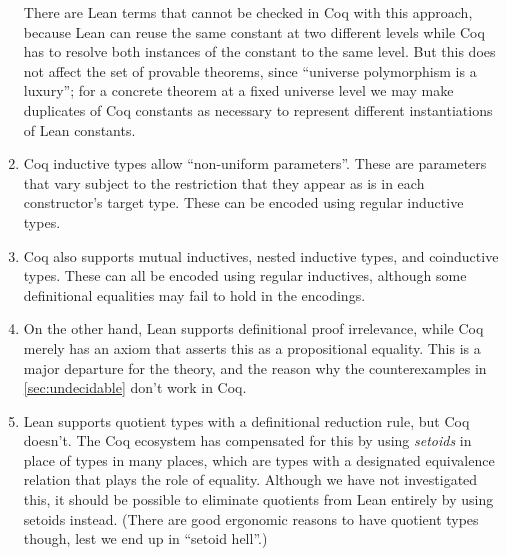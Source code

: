 \begin{enumerate}
There are Lean terms that cannot be checked in Coq with this approach, because Lean can reuse the same constant at two different levels while Coq has to resolve both instances of the constant to the same level. But this does not affect the set of provable theorems, since ``universe polymorphism is a luxury''; for a concrete theorem at a fixed universe level we may make duplicates of Coq constants as necessary to represent different instantiations of Lean constants.

\item Coq inductive types allow ``non-uniform parameters''. These are parameters that vary subject to the restriction that they appear as is in each constructor's target type. These can be encoded using regular inductive types.

\item Coq also supports mutual inductives, nested inductive types, and coinductive types. These can all be encoded using regular inductives, although some definitional equalities may fail to hold in the encodings.

\item On the other hand, Lean supports definitional proof irrelevance, while Coq merely has an axiom that asserts this as a propositional equality. This is a major departure for the theory, and the reason why the counterexamples in \autoref{sec:undecidable} don't work in Coq.

\item Lean supports quotient types with a definitional reduction rule, but Coq doesn't. The Coq ecosystem has compensated for this by using \emph{setoids} in place of types in many places, which are types with a designated equivalence relation that plays the role of equality. Although we have not investigated this, it should be possible to eliminate quotients from Lean entirely by using setoids instead. (There are good ergonomic reasons to have quotient types though, lest we end up in ``setoid hell''.)


\end{enumerate}
